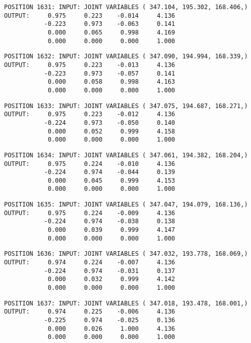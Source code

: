 \begin{verbatim}
POSITION 1631: INPUT: JOINT VARIABLES ( 347.104, 195.302, 168.406,)
OUTPUT:     0.975     0.223    -0.014     4.136
           -0.223     0.973    -0.063     0.141
            0.000     0.065     0.998     4.169
            0.000     0.000     0.000     1.000
\end{verbatim} \pagebreak[1]\begin{verbatim}
POSITION 1632: INPUT: JOINT VARIABLES ( 347.090, 194.994, 168.339,)
OUTPUT:     0.975     0.223    -0.013     4.136
           -0.223     0.973    -0.057     0.141
            0.000     0.058     0.998     4.163
            0.000     0.000     0.000     1.000
\end{verbatim} \pagebreak[1]\begin{verbatim}
POSITION 1633: INPUT: JOINT VARIABLES ( 347.075, 194.687, 168.271,)
OUTPUT:     0.975     0.223    -0.012     4.136
           -0.224     0.973    -0.050     0.140
            0.000     0.052     0.999     4.158
            0.000     0.000     0.000     1.000
\end{verbatim} \pagebreak[1]\begin{verbatim}
POSITION 1634: INPUT: JOINT VARIABLES ( 347.061, 194.382, 168.204,)
OUTPUT:     0.975     0.224    -0.010     4.136
           -0.224     0.974    -0.044     0.139
            0.000     0.045     0.999     4.153
            0.000     0.000     0.000     1.000
\end{verbatim} \pagebreak[1]\begin{verbatim}
POSITION 1635: INPUT: JOINT VARIABLES ( 347.047, 194.079, 168.136,)
OUTPUT:     0.975     0.224    -0.009     4.136
           -0.224     0.974    -0.038     0.138
            0.000     0.039     0.999     4.147
            0.000     0.000     0.000     1.000
\end{verbatim} \pagebreak[1]\begin{verbatim}
POSITION 1636: INPUT: JOINT VARIABLES ( 347.032, 193.778, 168.069,)
OUTPUT:     0.974     0.224    -0.007     4.136
           -0.224     0.974    -0.031     0.137
            0.000     0.032     0.999     4.142
            0.000     0.000     0.000     1.000
\end{verbatim} \pagebreak[1]\begin{verbatim}
POSITION 1637: INPUT: JOINT VARIABLES ( 347.018, 193.478, 168.001,)
OUTPUT:     0.974     0.225    -0.006     4.136
           -0.225     0.974    -0.025     0.136
            0.000     0.026     1.000     4.136
            0.000     0.000     0.000     1.000
\end{verbatim} \pagebreak[1]\begin{verbatim}

\end{verbatim}
